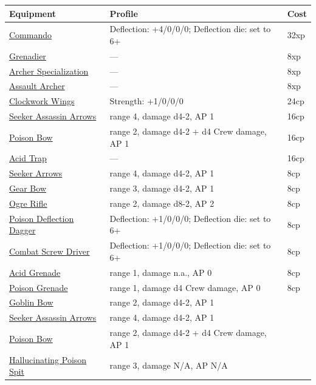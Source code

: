 \documentclass[a4paper,12pt]{article}
\begin{document}
\begin{longtable}{@{}p{}p{}l@{}}
\textbf{Equipment} & \textbf{Profile} & \textbf{Cost} \\
\hline
\endhead
\hyperref[equipment-commando]{Commando} & Deflection: +4/0/0/0; Deflection die: set to 6+ & 32xp \\
\hyperref[equipment-grenadier]{Grenadier} & --- & 8xp \\
\hyperref[equipment-archer-specialization]{Archer Specialization} & --- & 8xp \\
\hyperref[equipment-assault-archer]{Assault Archer} & --- & 8xp \\
\hyperref[equipment-clockwork-wings]{Clockwork Wings} & Strength: +1/0/0/0 & 24cp \\
\hyperref[equipment-seeker-assassin-arrows]{Seeker Assassin Arrows} & range 4, damage d4-2, AP 1 & 16cp \\
\hyperref[equipment-poison-bow]{Poison Bow} & range 2, damage d4-2 + d4 Crew damage, AP 1 & 16cp \\
\hyperref[equipment-acid-trap]{Acid Trap} & --- & 16cp \\
\hyperref[equipment-seeker-arrows]{Seeker Arrows} & range 4, damage d4-2, AP 1 & 8cp \\
\hyperref[equipment-gear-bow]{Gear Bow} & range 3, damage d4-2, AP 1 & 8cp \\
\hyperref[equipment-ogre-rifle]{Ogre Rifle} & range 2, damage d8-2, AP 2 & 8cp \\
\hyperref[equipment-poison-deflection-dagger]{Poison Deflection Dagger} & Deflection: +1/0/0/0; Deflection die: set to 6+ & 8cp \\
\hyperref[equipment-combat-screw-driver]{Combat Screw Driver} & Deflection: +1/0/0/0; Deflection die: set to 6+ & 8cp \\
\hyperref[equipment-acid-grenade]{Acid Grenade} & range 1, damage n.a., AP 0 & 8cp \\
\hyperref[equipment-poison-grenade]{Poison Grenade} & range 1, damage d4 Crew damage, AP 0 & 8cp \\
\hyperref[equipment-goblin-bow]{Goblin Bow} & range 2, damage d4-2, AP 1 &  \\
\hyperref[equipment-seeker-assassin-arrows-free]{Seeker Assassin Arrows} & range 4, damage d4-2, AP 1 &  \\
\hyperref[equipment-poison-bow-free]{Poison Bow} & range 2, damage d4-2 + d4 Crew damage, AP 1 &  \\
\hyperref[equipment-hallucinating-poison-spit]{Hallucinating Poison Spit} & range 3, damage N/A, AP N/A &  \\

\end{longtable}
\end{document}
